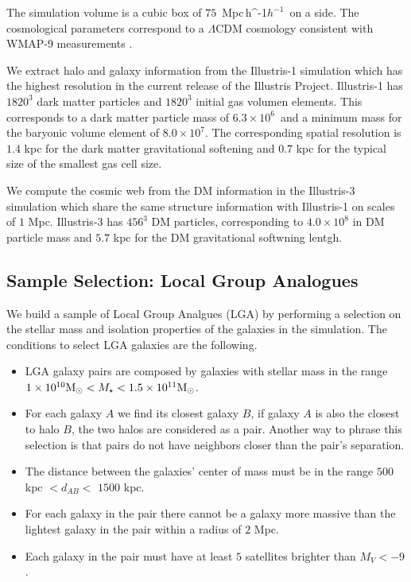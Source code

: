 \documentclass[a4paper,fleqn,usenatbib]{mnras}
\newcommand{\Mpch}{\,{\rm Mpc}\,\ifmmode h^{-1}\else $h^{-1}$\fi}
\newcommand{\Msun}{{\ifmmode{{\rm{M_{\odot}}}}\else{${\rm{M_{\odot}}}$}\fi}}
\begin{document}
The simulation volume is a cubic box of $75$ \Mpch\ on a side.
The cosmological parameters correspond to a $\Lambda$CDM cosmology
consistent with WMAP-9 measurements \citep{2013ApJS..208...19H}. 

We extract halo and galaxy information from the Illustris-1 simulation
which has the highest resolution in the current release of the
Illustris Project.
Illustris-1 has $1820^3$ dark matter particles and $1820^3$ initial gas
volumen elements. 
This corresponds to a dark matter particle mass of
$6.3\times 10^6$\Msun\ and a minimum mass for the baryonic volume
element of $8.0\times 10^7$\Msun. 
The corresponding spatial resolution is $1.4$ kpc for the dark matter
gravitational softening and $0.7$ kpc for the typical size of the
smallest gas cell size. 

We compute the cosmic web from the DM information in the
Illustris-3 simulation which share the same structure information with
Illustris-1 on scales of $1$ Mpc.  
Illustris-3 has $456^3$ DM particles, corresponding to
$4.0\times 10^8$ \Msun in DM particle mass and $5.7$ kpc for the DM
gravitational softwning lentgh.
 

\subsection{Sample Selection: Local Group Analogues}

We build a sample of Local Group Analgues (LGA) by performing a selection on
the stellar mass and isolation properties of the galaxies in the
simulation. The conditions to select LGA galaxies are the following.

\begin{itemize}
\item LGA galaxy pairs are composed by galaxies with stellar mass in the
range $1\times10^{10}\Msun <M_{\star}<1.5 \times 10^{11} \Msun$.
\item For each galaxy $A$ we find its closest galaxy $B$, if galaxy $A$ is also
the closest to halo $B$, the two halos are considered as a pair. 
Another way to phrase this selection is that pairs do not have
neighbors closer than the pair's separation.
\item The distance between the galaxies' center of
  mass must be in the range $500$ kpc $<d_{AB}<$ $1500$ kpc. 
\item For each galaxy in the pair there cannot be a galaxy more
  massive than the lightest galaxy in the pair within a radius of $2$
  Mpc. 
\item Each galaxy in the pair must have at least $5$ satellites
  brighter than  $M_V<-9$.
\end{itemize}
\end{document}
